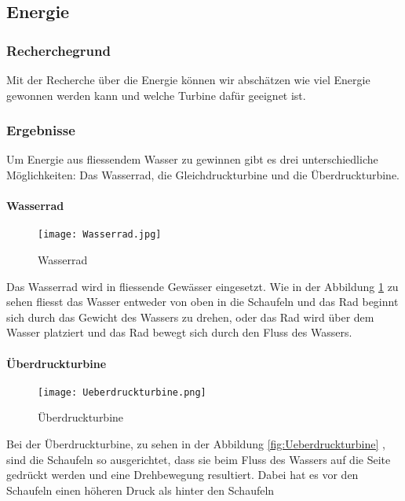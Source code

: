 \subsection{Energie}

\subsubsection{Recherchegrund}

Mit der Recherche über die Energie können wir abschätzen wie viel Energie gewonnen werden kann und welche Turbine dafür geeignet ist.

\subsubsection{Ergebnisse}

Um Energie aus fliessendem Wasser zu gewinnen gibt es drei unterschiedliche Möglichkeiten: Das Wasserrad, die Gleichdruckturbine und die Überdruckturbine. 

\paragraph{Wasserrad}
\begin{figure}[H]
	\centering
	\texttt{[image: Wasserrad.jpg]}
	\caption{Wasserrad \cite{wisse}} 
	\label{fig:Wasserrad}
\end{figure}

Das Wasserrad wird in fliessende Gewässer eingesetzt. Wie in der Abbildung \ref{fig:Wasserrad}  zu sehen fliesst das Wasser entweder von oben in die Schaufeln und das Rad beginnt sich durch das Gewicht des Wassers zu drehen, oder das Rad wird über dem Wasser platziert und das Rad bewegt sich durch den Fluss des Wassers.

\newpage

\paragraph{Überdruckturbine}
\begin{figure} [H]
	\centering
	\texttt{[image: Ueberdruckturbine.png]}
	\caption{Überdruckturbine \cite{wiki_ueberdruck}}
	\label{fig:	Überdruckturbine}
\end{figure}

Bei der Überdruckturbine, zu sehen in der Abbildung \ref{fig:Ueberdruckturbine} , sind die Schaufeln so ausgerichtet, dass sie beim Fluss des Wassers auf die Seite gedrückt werden und eine Drehbewegung resultiert. Dabei hat es vor den Schaufeln einen höheren Druck als hinter den Schaufeln

